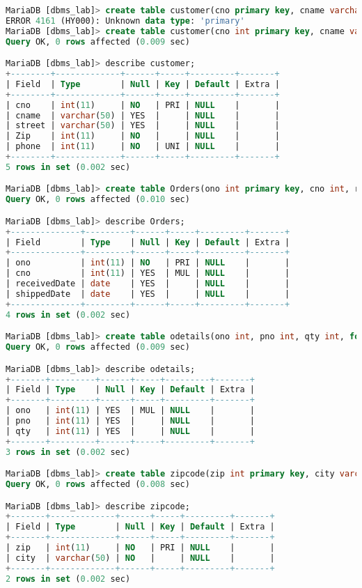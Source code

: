\documentclass{article}
\begin{document}
\begin{lstlisting}[language=SQL]
MariaDB [dbms_lab]> create table customer(cno primary key, cname varchar(50), street varchar(50), Zip int not null, phone int not null unique);
ERROR 4161 (HY000): Unknown data type: 'primary'
MariaDB [dbms_lab]> create table customer(cno int primary key, cname varchar(50), street varchar(50), Zip int not null, phone int not null unique);
Query OK, 0 rows affected (0.009 sec)

MariaDB [dbms_lab]> describe customer;
+--------+-------------+------+-----+---------+-------+
| Field  | Type        | Null | Key | Default | Extra |
+--------+-------------+------+-----+---------+-------+
| cno    | int(11)     | NO   | PRI | NULL    |       |
| cname  | varchar(50) | YES  |     | NULL    |       |
| street | varchar(50) | YES  |     | NULL    |       |
| Zip    | int(11)     | NO   |     | NULL    |       |
| phone  | int(11)     | NO   | UNI | NULL    |       |
+--------+-------------+------+-----+---------+-------+
5 rows in set (0.002 sec)

MariaDB [dbms_lab]> create table Orders(ono int primary key, cno int, receivedDate date, shippedDate date, foreign key(cno) references customer(cno));
Query OK, 0 rows affected (0.010 sec)

MariaDB [dbms_lab]> describe Orders;
+--------------+---------+------+-----+---------+-------+
| Field        | Type    | Null | Key | Default | Extra |
+--------------+---------+------+-----+---------+-------+
| ono          | int(11) | NO   | PRI | NULL    |       |
| cno          | int(11) | YES  | MUL | NULL    |       |
| receivedDate | date    | YES  |     | NULL    |       |
| shippedDate  | date    | YES  |     | NULL    |       |
+--------------+---------+------+-----+---------+-------+
4 rows in set (0.002 sec)

MariaDB [dbms_lab]> create table odetails(ono int, pno int, qty int, foreign key(ono) references Orders(ono));
Query OK, 0 rows affected (0.009 sec)

MariaDB [dbms_lab]> describe odetails;
+-------+---------+------+-----+---------+-------+
| Field | Type    | Null | Key | Default | Extra |
+-------+---------+------+-----+---------+-------+
| ono   | int(11) | YES  | MUL | NULL    |       |
| pno   | int(11) | YES  |     | NULL    |       |
| qty   | int(11) | YES  |     | NULL    |       |
+-------+---------+------+-----+---------+-------+
3 rows in set (0.002 sec)

MariaDB [dbms_lab]> create table zipcode(zip int primary key, city varchar(50) not null check(city in ('Pune', 'Mumbai')));
Query OK, 0 rows affected (0.008 sec)

MariaDB [dbms_lab]> describe zipcode;
+-------+-------------+------+-----+---------+-------+
| Field | Type        | Null | Key | Default | Extra |
+-------+-------------+------+-----+---------+-------+
| zip   | int(11)     | NO   | PRI | NULL    |       |
| city  | varchar(50) | NO   |     | NULL    |       |
+-------+-------------+------+-----+---------+-------+
2 rows in set (0.002 sec)
\end{lstlisting}
\end{document}
